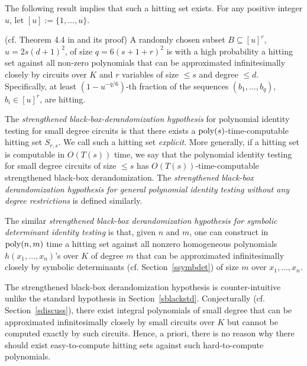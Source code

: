 \documentclass[11pt]{article}
\begin{document}
The following result implies  that such a hitting set exists.
For any positive integer $u$, let $[u]:=\{1,\ldots,u\}$.

\begin{theorem}  (cf. Theorem 4.4 in \cite{schnorr} and its proof) \label{theintz}
A randomly chosen subset 
$B \subseteq [u]^r$, $u=2 s (d+1)^2$,  of size $q=6 (s+1+r)^2$ is with a high probability a hitting set 
against all non-zero polynomials that can be approximated infinitesimally closely by 
 circuits over $K$ and $r$ variables of size $\le s$ and degree $\le d$.
Specifically, at least $(1-u^{-q/6})$-th fraction of the sequences $(b_1,\ldots,b_q)$, $b_i \in [u]^r$, are hitting.
\end{theorem}

The  {\em strengthened black-box-derandomization hypothesis} for polynomial identity testing for small degree circuits is that there exists  a ${\mbox {poly}}(s)$-time-computable  hitting set
$S_{r,s}$.  We call such a hitting set {\em explicit}.
More generally, if a hitting set  is computable  in $O(T(s))$ time, 
we say that the polynomial identity testing for small degree circuits of size $\le s$
has $O(T(s))$-time-computable strengthened black-box derandomization. 
The {\em strengthened black-box derandomization hypothesis for general polynomial identity testing without any degree restrictions} is defined similarly.

The similar 
{\em strengthened black-box derandomization hypothesis for symbolic determinant identity testing} is that,  given $n$ and $m$, 
one can construct in  ${\mbox {poly}}(n,m)$ time a hitting set 
against all nonzero homogeneous polynomials $h(x_1,\ldots,x_n)$'s over $K$ of degree $m$ that 
can be approximated infinitesimally closely
by symbolic determinants (cf. Section~\ref{ssymbdet}) of size $m$ over $x_1,\ldots,x_n$.



The strengthened black-box derandomization hypothesis 
is   counter-intuitive unlike the  standard   hypothesis in  Section~\ref{sblackstd}.
Conjecturally (cf.  Section~\ref{sdiscuss}), there  exist
integral polynomials of small degree that can be approximated infinitesimally closely by small  circuits over $K$
but  cannot be computed exactly by such circuits. Hence, a priori, there is no reason why there should exist easy-to-compute 
hitting sets against such hard-to-compute polynomials.
\end{document}
